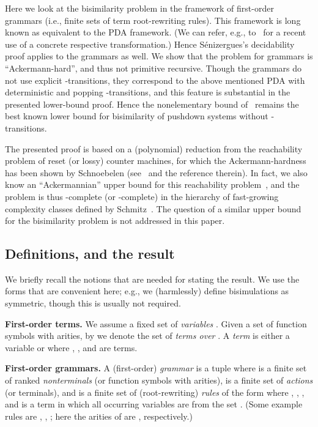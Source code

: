 \documentclass[a4paper,11pt]{article}
\begin{document}
Here we look at the bisimilarity problem in the framework of 
first-order grammars (i.e., finite sets of term root-rewriting rules). 
This framework is long known as equivalent to the PDA framework.
(We can refer, e.g., to~\cite{JancarLICS12} for a recent use of a concrete
respective transformation.)
Hence  S\'enizergues's decidability proof applies to the grammars as
well.
We show that the problem for grammars is
``Ackermann-hard'', and thus not primitive recursive. 
Though the grammars do not use explicit -transitions, they
correspond to the above mentioned PDA with deterministic and popping
-transitions, and this feature is substantial in the
presented lower-bound proof.
Hence the nonelementary bound of~\cite{BGKM12} remains
the best known lower bound for bisimilarity of pushdown systems
without -transitions.

The presented proof is based on
a (polynomial) reduction from the reachability problem of reset (or
lossy) counter machines, for which  the Ackermann-hardness has been
shown by Schnoebelen (see~\cite{DBLP:conf/mfcs/Schnoebelen10} and the
reference therein).
In fact, we also know an ``Ackermannian'' upper bound for this
reachability problem~\cite{DBLP:conf/lics/FigueiraFSS11}, 
and the problem is thus -complete (or 
-complete) 
 in the hierarchy of fast-growing
complexity classes defined by Schmitz~\cite{Schmitz2013}.
The question of a similar
upper bound for the bisimilarity problem is not addressed in this
paper.


\subsection*{Definitions, and the result}

We briefly recall the notions 
that are needed for stating the result. We use the forms that are
convenient here; e.g., we (harmlessly) 
define bisimulations as symmetric, though
this is usually not required. 

\textbf{First-order terms.}
We assume a fixed set of 
\emph{variables} .
Given a set  of function symbols with arities,
by  we
denote the set of \emph{terms over} .
A \emph{term} 
is either  a variable  
or   where 
, 
, and  are terms.

\textbf{First-order grammars.}
A (first-order) \emph{grammar} is a tuple 
where  is a finite set of ranked \emph{nonterminals}
(or function symbols with arities),
 is a finite set of  \emph{actions} (or terminals),
and  is a finite set of (root-rewriting) \emph{rules} of the form
 where 
, ,
, and
 is a 
term
in which all occurring variables are from the set 
.
(Some example rules are ,
,
; here
 the arities of  are , respectively.)
\end{document}
